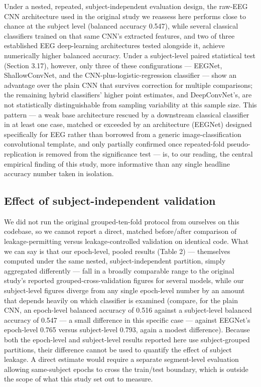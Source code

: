 \documentclass[a4paper,fleqn]{cas-sc}
\begin{document}
Under a nested, repeated, subject-independent evaluation design, the raw-EEG CNN architecture used in the original study we reassess here performs close to chance at the subject level (balanced accuracy 0.547), while several classical classifiers trained on that same CNN's extracted features, and two of three established EEG deep-learning architectures tested alongside it, achieve numerically higher balanced accuracy. Under a subject-level paired statistical test (Section 3.17), however, only three of these configurations --- EEGNet, ShallowConvNet, and the CNN-plus-logistic-regression classifier --- show an advantage over the plain CNN that survives correction for multiple comparisons; the remaining hybrid classifiers' higher point estimates, and DeepConvNet's, are not statistically distinguishable from sampling variability at this sample size. This pattern --- a weak base architecture rescued by a downstream classical classifier in at least one case, matched or exceeded by an architecture (EEGNet) designed specifically for EEG rather than borrowed from a generic image-classification convolutional template, and only partially confirmed once repeated-fold pseudo-replication is removed from the significance test --- is, to our reading, the central empirical finding of this study, more informative than any single headline accuracy number taken in isolation.



\subsection{Effect of subject-independent validation}

We did not run the original grouped-ten-fold protocol from \cite{taghibeyglou2022detection} ourselves on this codebase, so we cannot report a direct, matched before/after comparison of leakage-permitting versus leakage-controlled validation on identical code. What we can say is that our epoch-level, pooled results (Table 2) --- themselves computed under the same nested, subject-independent partition, simply aggregated differently --- fall in a broadly comparable range to the original study's reported grouped-cross-validation figures for several models, while our subject-level figures diverge from any single epoch-level number by an amount that depends heavily on which classifier is examined (compare, for the plain CNN, an epoch-level balanced accuracy of 0.516 against a subject-level balanced accuracy of 0.547 --- a small difference in this specific case --- against EEGNet's epoch-level 0.765 versus subject-level 0.793, again a modest difference). Because both the epoch-level and subject-level results reported here use subject-grouped partitions, their difference cannot be used to quantify the effect of subject leakage. A direct estimate would require a separate segment-level evaluation allowing same-subject epochs to cross the train/test boundary, which is outside the scope of what this study set out to measure.
\end{document}
